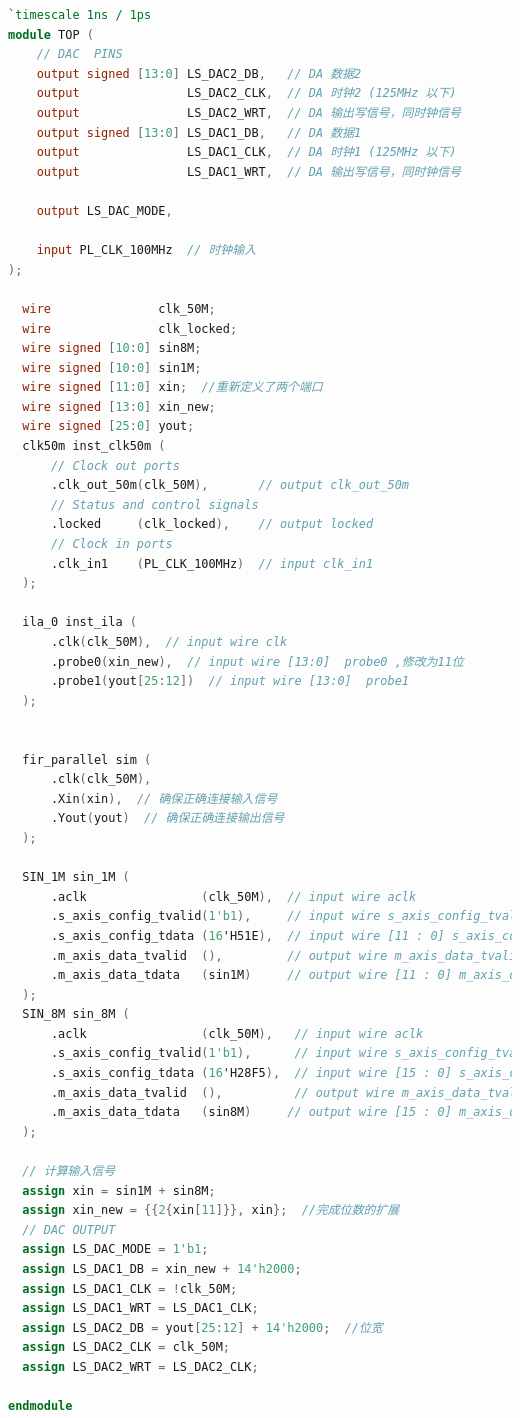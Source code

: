 \begin{lstlisting}[language=verilog,caption={顶层模块}]
`timescale 1ns / 1ps
module TOP (
    // DAC  PINS
    output signed [13:0] LS_DAC2_DB,   // DA 数据2
    output               LS_DAC2_CLK,  // DA 时钟2 (125MHz 以下)
    output               LS_DAC2_WRT,  // DA 输出写信号，同时钟信号
    output signed [13:0] LS_DAC1_DB,   // DA 数据1
    output               LS_DAC1_CLK,  // DA 时钟1 (125MHz 以下)
    output               LS_DAC1_WRT,  // DA 输出写信号，同时钟信号

    output LS_DAC_MODE,     

    input PL_CLK_100MHz  // 时钟输入
);

  wire               clk_50M;
  wire               clk_locked;
  wire signed [10:0] sin8M;
  wire signed [10:0] sin1M;
  wire signed [11:0] xin;  //重新定义了两个端口
  wire signed [13:0] xin_new;
  wire signed [25:0] yout;
  clk50m inst_clk50m (
      // Clock out ports
      .clk_out_50m(clk_50M),       // output clk_out_50m
      // Status and control signals
      .locked     (clk_locked),    // output locked
      // Clock in ports
      .clk_in1    (PL_CLK_100MHz)  // input clk_in1
  );

  ila_0 inst_ila (
      .clk(clk_50M),  // input wire clk
      .probe0(xin_new),  // input wire [13:0]  probe0 ,修改为11位 
      .probe1(yout[25:12])  // input wire [13:0]  probe1
  );


  fir_parallel sim (
      .clk(clk_50M),
      .Xin(xin),  // 确保正确连接输入信号
      .Yout(yout)  // 确保正确连接输出信号
  );

  SIN_1M sin_1M (
      .aclk                (clk_50M),  // input wire aclk
      .s_axis_config_tvalid(1'b1),     // input wire s_axis_config_tvalid
      .s_axis_config_tdata (16'H51E),  // input wire [11 : 0] s_axis_config_tdata
      .m_axis_data_tvalid  (),         // output wire m_axis_data_tvalid
      .m_axis_data_tdata   (sin1M)     // output wire [11 : 0] m_axis_data_tdata
  );
  SIN_8M sin_8M (
      .aclk                (clk_50M),   // input wire aclk
      .s_axis_config_tvalid(1'b1),      // input wire s_axis_config_tvalid
      .s_axis_config_tdata (16'H28F5),  // input wire [15 : 0] s_axis_config_tdata
      .m_axis_data_tvalid  (),          // output wire m_axis_data_tvalid
      .m_axis_data_tdata   (sin8M)     // output wire [15 : 0] m_axis_data_tdata
  );

  // 计算输入信号
  assign xin = sin1M + sin8M;
  assign xin_new = {{2{xin[11]}}, xin};  //完成位数的扩展
  // DAC OUTPUT
  assign LS_DAC_MODE = 1'b1;
  assign LS_DAC1_DB = xin_new + 14'h2000;  
  assign LS_DAC1_CLK = !clk_50M;
  assign LS_DAC1_WRT = LS_DAC1_CLK;
  assign LS_DAC2_DB = yout[25:12] + 14'h2000;  //位宽
  assign LS_DAC2_CLK = clk_50M;
  assign LS_DAC2_WRT = LS_DAC2_CLK;

endmodule


\end{lstlisting}

